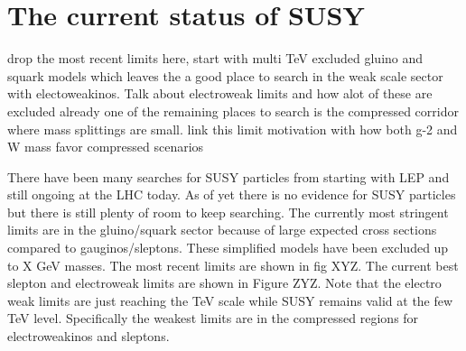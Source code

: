 \section{The current status of SUSY}
drop the most recent limits here, start with multi TeV excluded gluino and squark models which leaves the a good place to search in the weak scale sector with electoweakinos. Talk about electroweak limits and how alot of these are excluded already one of the remaining places to search is the compressed corridor where mass splittings are small. link this limit motivation with how both g-2 and W mass favor compressed scenarios

There have been many searches for SUSY particles from starting with LEP and still ongoing at the LHC today. As of yet there is no evidence for SUSY particles but there is still plenty of room to keep searching. The currently most stringent limits are in the gluino/squark sector because of large expected cross sections compared to gauginos/sleptons. These simplified models have been excluded up to X GeV masses. The most recent limits are shown in fig XYZ.  The current best slepton and electroweak limits are shown in Figure ZYZ. Note that the electro weak limits are just reaching the TeV scale while SUSY remains valid at the few TeV level. Specifically the weakest limits are in the compressed regions for electroweakinos and sleptons. 



